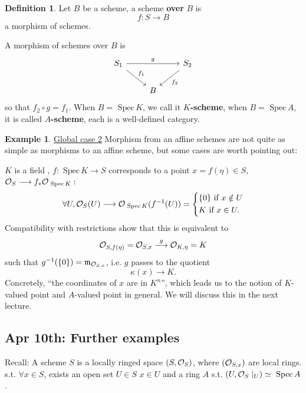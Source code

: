 \documentclass[11pt]{article}
\theoremstyle{definition}
\newtheorem{dfn}[thm]{Definition}
\newtheorem{ex}[thm]{Example}
\newcommand{\spec}{\text{ Spec}\,}
\newcommand{\scm}{{\mathfrak m}}
\newcommand{\calo}{{\cal O}}
\newcommand{\lrta}{\longrightarrow}
\begin{document}
\begin{dfn}
Let $B$ be a scheme, a scheme \textbf{over } $B$ is 
$$
f:S\lrta B
$$
a morphism of schemes.

A morphism of schemes over $B$ is 
$$
\begin{tikzcd}
S_1 \arrow[rd, "f_1"] \arrow[rr, "g"] &  & S_2 \arrow[ld, "f_2"] \\
 & B & 
\end{tikzcd}
$$
so that $f_2\circ g=f_1$. When $B=\spec K$, we call it \textbf{$K$-scheme}, when $B=\spec A$, it is called \textbf{$A$-scheme}, each is a well-defined category.
\end{dfn}
\begin{ex}
\underline{Global case 2} Morphism from an affine schemes are not quite as simple as morphisms to an affine scheme, but some cases are worth pointing out:

 $K$ is a field , $f:\spec K\lrta S$ corresponds to a point $x=f(\eta)\in S$, $\calo_S\lrta f_*\calo_{\spec K}:$ $$
\forall U,\calo_S(U)\lrta \calo_{\spec K}(f^{-1}(U))=\left\{\begin{aligned}
&\{0\}\text{ if }x\notin U\\
& K\text{ if } x\in U.
\end{aligned}
\right.$$
Compatibility with restrictions show that this is equivalent to
$$
\calo_{S,f(\eta)}=\calo_{S,x}\overset{g}{\lrta}\calo_{K,\eta}=K
$$
such that $g^{-1}(\{0\})=\scm_{\calo_{S,x}}$, i.e.
$g$ passes to the quotient
$$
\kappa(x)\lrta K.
$$
Concretely, ``the coordinates of $x$ are in $K^n$'', which leads us to the notion of $K$-valued point and $A$-valued point in general. We will discuss this in the next lecture.
\end{ex}

\subsection{Apr 10th: Further examples }
Recall: A scheme $S$ is a  locally ringed space $(S,\calo_S)$, where $(\calo_{S,x})$ are local rings. s.t. $\forall x\in S$, exists an open set $U\in S$ $x\in U$ and a ring $A$ s.t. 
$(U,\calo_{S}\mid_U)\simeq \spec A$.
\end{document}
